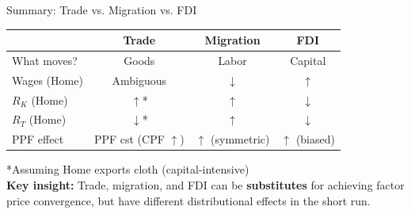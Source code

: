 \documentclass{beamer}
\begin{document}
\begin{frame}{Summary: Trade vs. Migration vs. FDI}
\begin{center}
\small
\begin{tabular}{lccc}
\toprule
& \textbf{Trade} & \textbf{Migration} & \textbf{FDI} \\
\midrule
What moves? & Goods & Labor & Capital \\
\midrule
Wages (Home) & Ambiguous & $\downarrow$ & $\uparrow$ \\
\midrule
$R_K$ (Home) & $\uparrow$* & $\uparrow$ & $\downarrow$ \\
\midrule
$R_T$ (Home) & $\downarrow$* & $\uparrow$ & $\downarrow$ \\
\midrule
PPF effect & PPF cst (CPF $\uparrow$) & $\uparrow$ (symmetric) & $\uparrow$ (biased) \\
\bottomrule
\end{tabular}
\end{center}
\footnotesize{*Assuming Home exports cloth (capital-intensive)} \\
\vspace{0.1cm}
\textbf{Key insight:} Trade, migration, and FDI can be \textbf{substitutes} for achieving factor price convergence, but have different distributional effects in the short run.
\end{frame}
\end{document}

